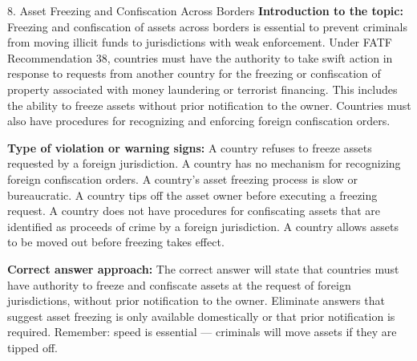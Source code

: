 \documentclass[11pt,a4paper]{beamer}
\begin{document}
\begin{frame}{8. Asset Freezing and Confiscation Across Borders}
\tiny
\noindent\textbf{Introduction to the topic:} Freezing and confiscation of assets across borders is essential to prevent criminals from moving illicit funds to jurisdictions with weak enforcement. Under FATF Recommendation 38, countries must have the authority to take swift action in response to requests from another country for the freezing or confiscation of property associated with money laundering or terrorist financing. This includes the ability to freeze assets without prior notification to the owner. Countries must also have procedures for recognizing and enforcing foreign confiscation orders.

\vspace{0.1cm}
\noindent\textbf{Type of violation or warning signs:} A country refuses to freeze assets requested by a foreign jurisdiction. A country has no mechanism for recognizing foreign confiscation orders. A country's asset freezing process is slow or bureaucratic. A country tips off the asset owner before executing a freezing request. A country does not have procedures for confiscating assets that are identified as proceeds of crime by a foreign jurisdiction. A country allows assets to be moved out before freezing takes effect.

\vspace{0.1cm}
\noindent\textbf{Correct answer approach:} The correct answer will state that countries must have authority to freeze and confiscate assets at the request of foreign jurisdictions, without prior notification to the owner. Eliminate answers that suggest asset freezing is only available domestically or that prior notification is required. Remember: speed is essential — criminals will move assets if they are tipped off.
\end{frame}
\end{document}
